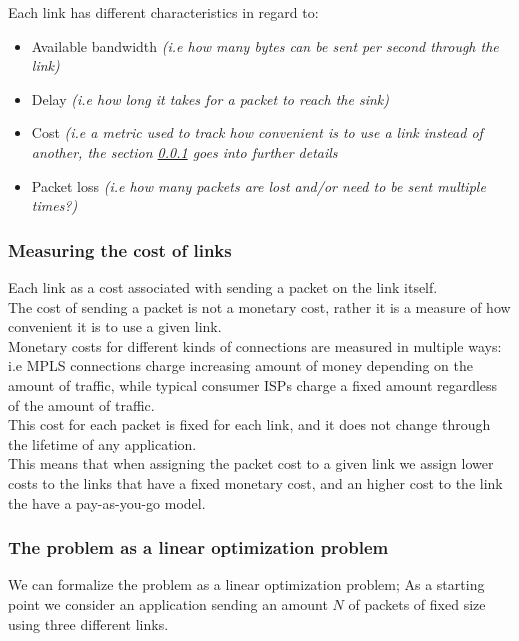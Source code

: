 Each link has different characteristics in regard to:
\begin{itemize}
	\item Available bandwidth \textit{(i.e how many bytes can be sent per second through the link)}
	\item Delay \textit{(i.e how long it takes for a packet to reach the sink)}
	\item Cost \textit{(i.e a metric used to track how convenient is to use a link instead of another, the section \ref{link_cost} goes into further details}
	\item Packet loss \textit{(i.e how many packets are lost and/or need to be sent multiple times?)}
\end{itemize} 



\subsubsection{Measuring the cost of links} \label{link_cost}
Each link as a cost associated with sending a packet on the link itself. \\
The cost of sending a packet is not a monetary cost, rather it is a measure of how convenient it is to use a given link. \\
Monetary costs for different kinds of connections are measured in multiple ways: i.e   MPLS connections charge increasing amount of money depending on the amount of traffic, while typical consumer ISPs charge a fixed amount regardless of the amount of traffic. \\
This cost for each packet is fixed for each link, and it does not change through the lifetime of any application. \\
This means that when assigning the packet cost to a given link we assign lower costs to the links that have a fixed monetary cost, and an higher cost to the link the have a pay-as-you-go model.


	
	\subsubsection{The problem as a linear optimization problem}  \label{linear_optimizaion_problem}
	
	We can formalize the problem as a linear optimization problem;
	As a starting point we consider an application sending an amount $N$ of packets of fixed size using three different links.
	

